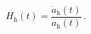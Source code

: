 \begin{equation}                                        \label{3**}
  H_{\text{h}}(t)=\frac{\dot{a}_{\text{h}}(t)}{a_{\text{h}}(t)}\,.
\end{equation}

